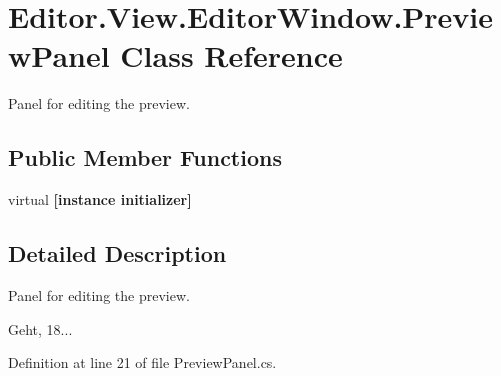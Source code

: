 \section{Editor.\-View.\-Editor\-Window.\-Preview\-Panel Class Reference}
\label{class_editor_1_1_view_1_1_editor_window_1_1_preview_panel}


Panel for editing the preview.  


\subsection*{Public Member Functions}
\begin{DoxyCompactItemize}
\item 
virtual {\bfseries [instance initializer]}\label{class_editor_1_1_view_1_1_editor_window_1_1_preview_panel_a1535e92a02d7df77e1066c1ce2aee7bd}

\end{DoxyCompactItemize}


\subsection{Detailed Description}
Panel for editing the preview. 

Geht, 18... 

Definition at line 21 of file Preview\-Panel.\-cs.

